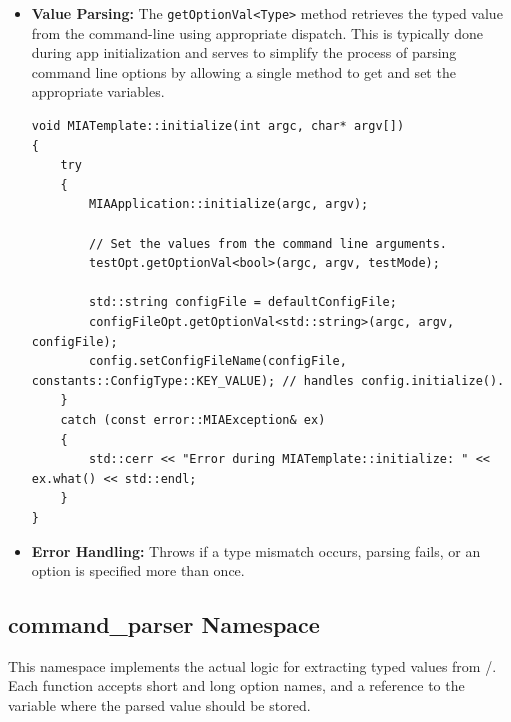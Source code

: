 \begin{itemize}
\begin{lstlisting}[style=cppstyle]
 // This is a dump of the help messages used by the various command options.
 std::cout << "MIATemplate specific options:" << std::endl
           << configFileOpt.getHelp() << std::endl
           << testOpt.getHelp() << std::endl
           << std::endl;
}
	\end{lstlisting}
	\item \textbf{Value Parsing:} The \texttt{getOptionVal<Type>} method retrieves the typed value from the command-line using appropriate dispatch. This is typically done during app initialization and serves to simplify the process of parsing command line options by allowing a single method to get and set the appropriate variables.
	\begin{lstlisting}[style=cppstyle]
void MIATemplate::initialize(int argc, char* argv[])
{
    try
    {    
        MIAApplication::initialize(argc, argv);

        // Set the values from the command line arguments.
        testOpt.getOptionVal<bool>(argc, argv, testMode);

        std::string configFile = defaultConfigFile;
        configFileOpt.getOptionVal<std::string>(argc, argv, configFile);
        config.setConfigFileName(configFile, constants::ConfigType::KEY_VALUE); // handles config.initialize().
    }
    catch (const error::MIAException& ex)
    {
        std::cerr << "Error during MIATemplate::initialize: " << ex.what() << std::endl;
    }
}
	\end{lstlisting}

	\item \textbf{Error Handling:} Throws  if a type mismatch occurs, parsing fails, or an option is specified more than once.
\end{itemize}

\subsection{command\_parser Namespace}

This namespace implements the actual logic for extracting typed values from /. Each function accepts short and long option names, and a reference to the variable where the parsed value should be stored.

